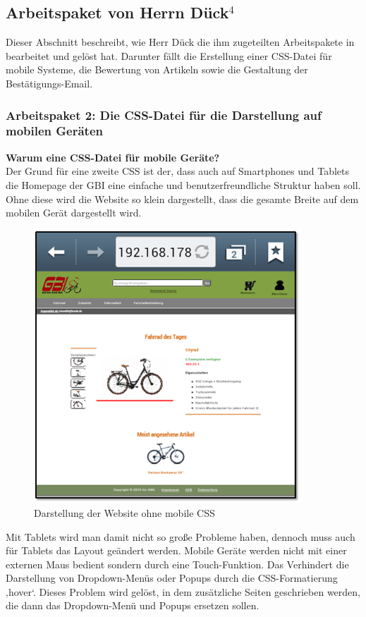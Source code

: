 \newpage
\subsection{Arbeitspaket von Herrn Dück$^4$}

Dieser Abschnitt beschreibt, wie Herr Dück die ihm zugeteilten Arbeitspakete in bearbeitet und gelöst hat. Darunter fällt die Erstellung einer CSS-Datei für mobile Systeme, die Bewertung von Artikeln sowie die Gestaltung der Bestätigungs-Email.


\subsubsection{Arbeitspaket 2: Die CSS-Datei für die Darstellung auf mobilen Geräten}

\textbf{Warum eine CSS-Datei für mobile Geräte?}
\\
Der Grund für eine zweite CSS ist der, dass auch auf Smartphones und Tablets die Homepage der GBI eine einfache und benutzerfreundliche Struktur haben soll. Ohne diese wird die Website so klein dargestellt, dass die gesamte Breite auf dem mobilen Gerät dargestellt wird.

\begin{figure}[H]
\begin{center}
\includegraphics[width=10cm]{Bilder/Michael_Abbildung1-DarstellungDerWebsiteOhneMobileCSS.png}
\end{center}
\caption{Darstellung der Website ohne mobile CSS}
\end{figure}

Mit Tablets wird man damit nicht so große Probleme haben, dennoch muss auch für Tablets das Layout geändert werden. 
Mobile Geräte werden nicht mit einer externen Maus bedient sondern durch eine Touch-Funktion. Das Verhindert die Darstellung von Dropdown-Menüs oder Popups durch die CSS-Formatierung ‚hover‘. Dieses Problem wird gelöst, in dem zusätzliche Seiten geschrieben werden, die dann das Dropdown-Menü und Popups ersetzen sollen.

